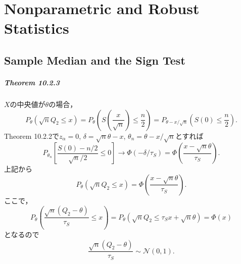 \chapter{Nonparametric and Robust Statistics}
\setcounter{section}{1}
\section{Sample Median and the Sign Test}
\paragraph{Theorem 10.2.3}
\(X\)の中央値が\(\theta\)の場合，
\[ P_\theta (\sqrt{n} Q_2 \leq x) = P_\theta \left( S\left(\frac{x}{\sqrt{n}}\right) \leq \frac{n}{2} \right) = P_{\theta - x/\sqrt{n}} \left( S(0) \leq \frac{n}{2} \right) . \]
Theorem 10.2.2で\(z_\alpha = 0\), \(\delta = \sqrt{n} \theta - x\), \(\theta_n = \theta - x/\sqrt{n}\)とすれば
\[ P_{\theta_n} \left[ \frac{S(0) - n/2}{\sqrt{n}/2} \leq 0 \right] \to \Phi(-\delta/\tau_S) = \Phi \left( \frac{x - \sqrt{n}\theta}{\tau_S} \right) . \]
上記から
\[ P_\theta (\sqrt{n} Q_2 \leq x) = \Phi \left( \frac{x - \sqrt{n}\theta}{\tau_S} \right) . \]
ここで，
\[ P_\theta \left( \frac{\sqrt{n}(Q_2 - \theta)}{\tau_S} \leq x \right) = P_\theta (\sqrt{n} Q_2 \leq \tau_S x + \sqrt{n} \theta) = \Phi (x) \]
となるので
\[ \frac{\sqrt{n}(Q_2 - \theta)}{\tau_S} \sim \mathcal{N}(0, 1) . \]

